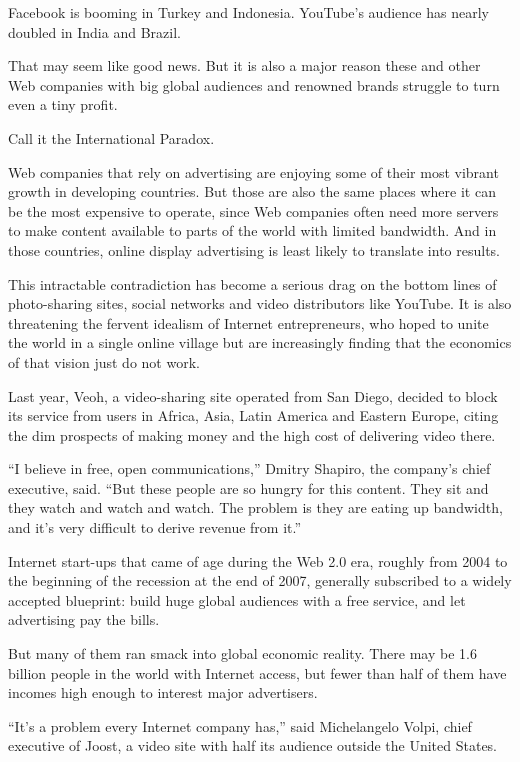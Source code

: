 \documentclass[12pt,a4paper,onecolumn]{article}
\begin{document}
Facebook is booming in Turkey and Indonesia. YouTube's audience has nearly doubled in India and
Brazil.

That may seem like good news. But it is also a major reason these and other Web companies with big
global audiences and renowned brands struggle to turn even a tiny profit.

Call it the International Paradox.

Web companies that rely on advertising are enjoying some of their most vibrant growth in developing
countries. But those are also the same places where it can be the most expensive to operate, since
Web companies often need more servers to make content available to parts of the world with limited
bandwidth. And in those countries, online display advertising is least likely to translate into
results.

This intractable contradiction has become a serious drag on the bottom lines of photo-sharing sites,
social networks and video distributors like YouTube. It is also threatening the fervent idealism of
Internet entrepreneurs, who hoped to unite the world in a single online village but are increasingly
finding that the economics of that vision just do not work.

Last year, Veoh, a video-sharing site operated from San Diego, decided to block its service from
users in Africa, Asia, Latin America and Eastern Europe, citing the dim prospects of making money
and the high cost of delivering video there.

``I believe in free, open communications,'' Dmitry Shapiro, the company's chief executive, said.
``But these people are so hungry for this content. They sit and they watch and watch and watch. The
problem is they are eating up bandwidth, and it's very difficult to derive revenue from it.''

Internet start-ups that came of age during the Web 2.0 era, roughly from 2004 to the beginning of
the recession at the end of 2007, generally subscribed to a widely accepted blueprint: build huge
global audiences with a free service, and let advertising pay the bills.

But many of them ran smack into global economic reality. There may be 1.6 billion people in the
world with Internet access, but fewer than half of them have incomes high enough to interest major
advertisers.

``It's a problem every Internet company has,'' said Michelangelo Volpi, chief executive of Joost, a
video site with half its audience outside the United States.
\end{document}
